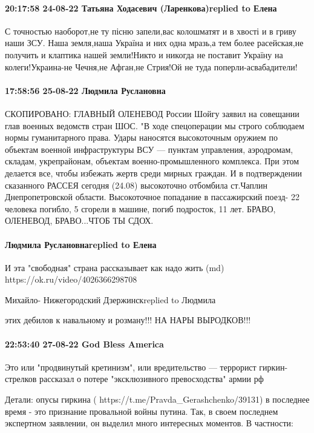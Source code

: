 \paragraph{20:17:58 24-08-22 Татьяна Ходасевич (Ларенкова)replied to Елена}

С точностью наоборот,не ту пісню запели,вас колошматят и в хвості и в гриву
наши ЗСУ. Наша земля,наша Україна и них одна мразь,а тем более расейская,не
получить и клаптика нашей земли!Никто и никогда не поставит Україну на
колеги!Украина-не Чечня,не Афган,не Стрия!Ой не туда поперли-асвабадители!

\paragraph{17:58:56 25-08-22 Людмила Руслановна}

СКОПИРОВАНО: ГЛАВНЫЙ ОЛЕНЕВОД России Шойгу заявил на совещании глав военных
ведомств стран ШОС. "В ходе спецоперации мы строго соблюдаем нормы
гуманитарного права. Удары наносятся высокоточным оружием по объектам военной
инфраструктуры ВСУ — пунктам управления, аэродромам, складам, укрепрайонам,
объектам военно-промышленного комплекса. При этом делается все, чтобы избежать
жертв среди мирных граждан. И в подтверждении сказанного РАССЕЯ сегодня (24.08)
высокоточно отбомбила ст.Чаплин Днепропетровской области. Высокоточное
попадание в пассажирский поезд- 22 человека погибло, 5 сгорели в машине, погиб
подросток, 11 лет. БРАВО, ОЛЕНЕВОД, БРАВО...ЧТОБ ТЫ СДОХ.

\paragraph{Людмила Руслановнаreplied to Елена}

И эта "свободная" страна рассказывает как надо жить (md)
https://ok.ru/video/4026366298708

Михайло- Нижегородский Дзержинскreplied to Людмила

этих дебилов к навальному и розману!!! НА НАРЫ ВЫРОДКОВ!!!

\paragraph{22:53:40 27-08-22 God Bless America}

Это или "продвинутый кретинизм", или вредительство — террорист гиркин-стрелков
рассказал о потере "эксклюзивного превосходства" армии рф

Детали: опусы гиркина (
https://t.me/Pravda_Gerashchenko/39131) в последнее время - это признание провальной войны путина. Так, в своем последнем экспертном заявлении, он выделил много интересных моментов. В частности:

